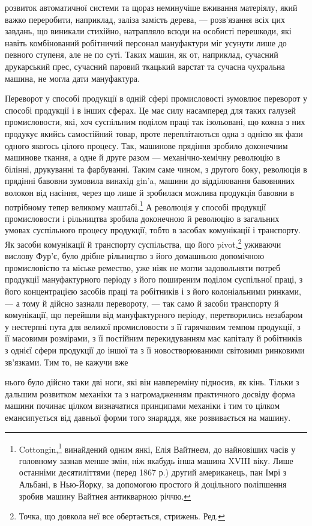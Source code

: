 розвиток автоматичної системи та щораз неминучіше вживання
матеріялу, який важко переробити, наприклад, заліза замість
дерева, — розв’язання всіх цих завдань, що виникали стихійно,
натрапляло всюди на особисті перешкоди, які навіть комбінований
робітничий персонал мануфактури міг усунути лише
до певного ступеня, але не по суті. Таких машин, як от, наприклад,
сучасний друкарський прес, сучасний паровий ткацький
варстат та сучасна чухральна машина, не могла дати
мануфактура.

Переворот у способі продукції в одній сфері промисловості
зумовлює переворот у способі продукції і в інших сферах. Це
має силу насамперед для таких галузей промисловости, які,
хоч суспільним поділом праці так ізольовані, що кожна з них
продукує якийсь самостійний товар, проте переплітаються одна
з однією як фази одного якогось цілого процесу. Так, машинове
прядіння зробило доконечним машинове ткання, а одне й друге
разом — механічно-хемічну революцію в білінні, друкуванні
та фарбуванні. Таким саме чином, з другого боку, революція в
прядінні бавовни зумовила винахід gin’a, машини до відділювання
бавовняних волокон від насіння, через що лише й зробилася
можлива продукція бавовни в потрібному тепер великому маштабі.\footnote{
Cottongin,\footnote*{
Машина, що вибирає зерно з бавовни. Ред.
} винайдений одним янкі, Елія Вайтнеєм, до найновіших
часів у головному зазнав менше змін, ніж якабудь інша машина XVIII віку.
Лише останніми десятиліттями (перед 1867 р.) другий американець, пан
Імрі з Альбані, в Нью-Йорку, за допомогою простого й доцільного
поліпшення зробив машину Вайтнея антикварною річчю.
}
А революція у способі продукції промисловости і рільництва
зробила доконечною й революцію в загальних умовах суспільного
процесу продукції, тобто в засобах комунікації і транспорту.
Як засоби комунікації й транспорту суспільства, що його
pivot,\footnote*{
Точка, що довкола неї все обертається, стрижень. Ред.
} уживаючи вислову Фур’є, було дрібне рільництво з його
домашньою допомічною промисловістю та міське ремество, уже
ніяк не могли задовольняти потреб продукції мануфактурного
періоду з його поширеним поділом суспільної праці, з його концентрацією
засобів праці та робітників і з його колоніальними
ринками, — а тому й дійсно зазнали перевороту, — так само й
засоби транспорту й комунікації, що перейшли від мануфактурного
періоду, перетворились незабаром у нестерпні пута для
великої промисловости з її гарячковим темпом продукції, з її масовими
розмірами, з її постійним перекидуванням мас капіталу й
робітників з однієї сфери продукції до іншої та з її новостворюваними
світовими ринковими зв’язками. Тим то, не кажучи вже

нього було дійсно таки дві ноги, які він навпереміну підносив, як кінь.
Тільки з дальшим розвитком механіки та з нагромадженням практичного
досвіду форма машини починає цілком визначатися принципами механіки
і тим то цілком емансипується від давньої форми того знаряддя, яке розвивається
на машину.